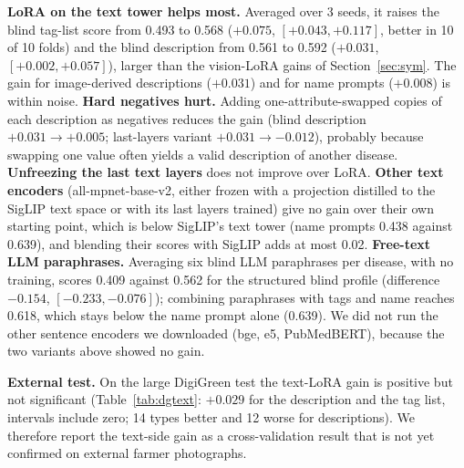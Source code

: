 \documentclass[11pt]{article}
\begin{document}
\begin{table}[t]\centering\small
\resizebox{\linewidth}{!}{}
\caption{Text-side adaptation, PlantWild 10-fold CV: gain over the same run's step 0 (zero-shot) in unit-macro top-1, with bootstrap 95\% intervals over folds. First row is the mean of 3 seeds, the others one seed.}\label{tab:textside}
\end{table}

\textbf{LoRA on the text tower helps most.} Averaged over 3 seeds, it raises the blind tag-list score from 0.493 to 0.568 ($+0.075$, $[+0.043, +0.117]$, better in 10 of 10 folds) and the blind description from 0.561 to 0.592 ($+0.031$, $[+0.002, +0.057]$), larger than the vision-LoRA gains of Section~\ref{sec:sym}. The gain for image-derived descriptions ($+0.031$) and for name prompts ($+0.008$) is within noise. \textbf{Hard negatives hurt.} Adding one-attribute-swapped copies of each description as negatives reduces the gain (blind description $+0.031 \to +0.005$; last-layers variant $+0.031 \to -0.012$), probably because swapping one value often yields a valid description of another disease. \textbf{Unfreezing the last text layers} does not improve over LoRA. \textbf{Other text encoders} (all-mpnet-base-v2, either frozen with a projection distilled to the SigLIP text space or with its last layers trained) give no gain over their own starting point, which is below SigLIP's text tower (name prompts 0.438 against 0.639), and blending their scores with SigLIP adds at most 0.02. \textbf{Free-text LLM paraphrases.} Averaging six blind LLM paraphrases per disease, with no training, scores 0.409 against 0.562 for the structured blind profile (difference $-0.154$, $[-0.233, -0.076]$); combining paraphrases with tags and name reaches 0.618, which stays below the name prompt alone (0.639). We did not run the other sentence encoders we downloaded (bge, e5, PubMedBERT), because the two variants above showed no gain.

\begin{table}[t]\centering\small
\resizebox{\linewidth}{!}{}
\caption{Large DigiGreen test (423 images, 39 types, blind profiles). Text LoRA trained on all PlantWild diseases that do not match a DigiGreen type (3 seeds, 250 steps) against the zero-shot score of the same pipeline. Gain with bootstrap interval over types.}\label{tab:dgtext}
\end{table}

\textbf{External test.} On the large DigiGreen test the text-LoRA gain is positive but not significant (Table~\ref{tab:dgtext}: $+0.029$ for the description and the tag list, intervals include zero; 14 types better and 12 worse for descriptions). We therefore report the text-side gain as a cross-validation result that is not yet confirmed on external farmer photographs.
\end{document}
